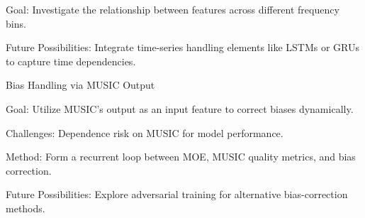 Goal: Investigate the relationship between features across different frequency bins.


Future Possibilities: Integrate time-series handling elements like LSTMs or GRUs to capture time dependencies.

Bias Handling via MUSIC Output

Goal: Utilize MUSIC's output as an input feature to correct biases dynamically.

Challenges: Dependence risk on MUSIC for model performance.

Method: Form a recurrent loop between MOE, MUSIC quality metrics, and bias correction.

Future Possibilities: Explore adversarial training for alternative bias-correction methods.










